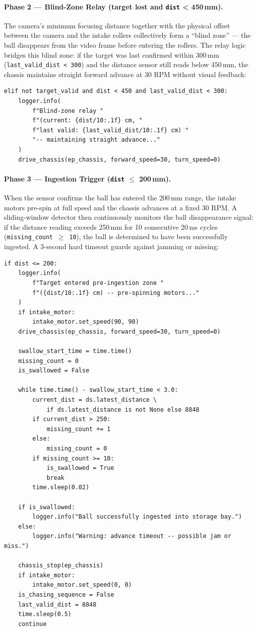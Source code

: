 \paragraph{Phase 2 --- Blind-Zone Relay (target lost and \texttt{dist} < 450\,mm).}
The camera's minimum focusing distance together with the physical offset between the camera and the intake rollers
collectively form a ``blind zone'' --- the ball disappears from the video frame before entering the rollers.
The relay logic bridges this blind zone: if the target was last confirmed within 300\,mm
(\texttt{last\_valid\_dist < 300}) and the distance sensor still reads below
450\,mm, the chassis maintains straight forward advance at 30 RPM without visual feedback:

\begin{verbatim}
elif not target_valid and dist < 450 and last_valid_dist < 300:
    logger.info(
        f"Blind-zone relay "
        f"(current: {dist/10:.1f} cm, "
        f"last valid: {last_valid_dist/10:.1f} cm) "
        "-- maintaining straight advance..."
    )
    drive_chassis(ep_chassis, forward_speed=30, turn_speed=0)
\end{verbatim}

\paragraph{Phase 3 --- Ingestion Trigger (\texttt{dist} $\leq$ 200\,mm).}
When the sensor confirms the ball has entered the 200\,mm range, the intake motors pre-spin at full speed
and the chassis advances at a fixed 30 RPM. A sliding-window detector then continuously monitors the ball disappearance signal:
if the distance reading exceeds 250\,mm for 10 consecutive 20\,ms cycles (\texttt{missing\_count $\geq$ 10}),
the ball is determined to have been successfully ingested. A 3-second hard timeout guards against jamming or missing:

\begin{verbatim}
if dist <= 200:
    logger.info(
        f"Target entered pre-ingestion zone "
        f"({dist/10:.1f} cm) -- pre-spinning motors..."
    )
    if intake_motor:
        intake_motor.set_speed(90, 90)
    drive_chassis(ep_chassis, forward_speed=30, turn_speed=0)

    swallow_start_time = time.time()
    missing_count = 0
    is_swallowed = False

    while time.time() - swallow_start_time < 3.0:
        current_dist = ds.latest_distance \
            if ds.latest_distance is not None else 8848
        if current_dist > 250:
            missing_count += 1
        else:
            missing_count = 0
        if missing_count >= 10:
            is_swallowed = True
            break
        time.sleep(0.02)

    if is_swallowed:
        logger.info("Ball successfully ingested into storage bay.")
    else:
        logger.info("Warning: advance timeout -- possible jam or miss.")

    chassis_stop(ep_chassis)
    if intake_motor:
        intake_motor.set_speed(0, 0)
    is_chasing_sequence = False
    last_valid_dist = 8848
    time.sleep(0.5)
    continue
\end{verbatim}

